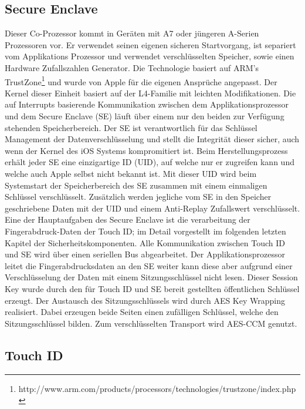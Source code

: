 	\subsection{Secure Enclave}
		Dieser Co-Prozessor kommt in Geräten mit A7 oder jüngeren A-Serien Prozessoren
		vor. Er verwendet seinen eigenen sicheren Startvorgang, ist separiert vom
		Applikations Prozessor und verwendet verschlüsselten Speicher, sowie einen
		Hardware Zufallszahlen Generator. Die Technologie basiert auf ARM's
		TrustZone\footnote{http://www.arm.com/products/processors/technologies/trustzone/index.php}
		und wurde von Apple für die eigenen Ansprüche angepasst. Der Kernel dieser
		Einheit basiert auf der L4-Familie mit leichten Modifikationen. Die auf
		Interrupts basierende Kommunikation zwischen dem Applikationsprozessor und dem
		Secure Enclave (SE) läuft über einem nur den beiden zur Verfügung stehenden
		Speicherbereich. Der SE ist verantwortlich für das Schlüssel Management der
		Datenverschlüsselung und stellt die Integrität dieser sicher, auch wenn der
		Kernel des iOS Systems kompromitiert ist. Beim Herstellungsprozess erhält
		jeder SE eine einzigartige ID (UID), auf welche nur er zugreifen kann und
		welche auch Apple selbst nicht bekannt ist.	Mit dieser UID wird beim
		Systemstart der Speicherbereich des SE zusammen mit einem einmaligen Schlüssel
		verschlüsselt. Zusätzlich werden jegliche vom SE in den Speicher geschriebene
		Daten mit der UID und einem Anti-Replay Zufallswert verschlüsselt. Eine der
		Hauptaufgaben des Secure Enclave ist die verarbeitung der Fingerabdruck-Daten
		der Touch ID; im Detail vorgestellt im folgenden letzten Kapitel der
		Sicherheitskomponenten. Alle Kommunikation zwischen Touch ID und SE wird über
		einen seriellen Bus abgearbeitet. Der Applikationsprozessor leitet
		die Fingerabdrucksdaten an den SE weiter kann diese aber aufgrund einer
		Verschlüsselung der Daten mit einem Sitzungsschlüssel nicht lesen. Dieser
		Session Key wurde durch den für Touch ID und SE bereit gestellten
		öffentlichen Schlüssel erzeugt. Der Austausch des Sitzungsschlüssels wird
		durch AES Key Wrapping realisiert. Dabei erzeugen beide Seiten einen
		zufälligen Schlüssel, welche den Sitzungsschlüssel bilden. Zum verschlüsselten
		Transport wird AES-CCM genutzt.
	\subsection{Touch ID}
		\cite{Zdziarski2012}